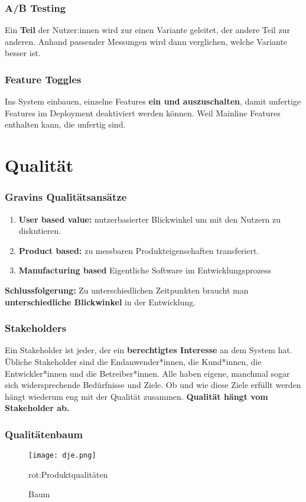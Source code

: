 \documentclass{book}
\begin{document}
    \subsection{A/B Testing}
    Ein \textbf{Teil} der Nutzer:innen wird zur einen Variante geleitet, der andere Teil zur anderen. Anhand passender Messungen wird dann verglichen, welche Variante besser ist.
    \subsection{Feature Toggles}
    Ins System einbauen, einzelne Features \textbf{ein und auszuschalten}, damit unfertige Features im Deployment deaktiviert werden können. Weil Mainline Features enthalten kann, die unfertig sind.


    \chapter{Qualität}
    \subsection{Gravins Qualitätsansätze}
    \begin{enumerate}
        \item \textbf{User based value:}
        nutzerbasierter Blickwinkel um mit den Nutzern zu diskutieren.
        \item \textbf{Product based:} zu messbaren Produkteigenschaften transferiert.
        \item \textbf{Manufacturing based}
        Eigentliche Software im Entwicklungsprozess
    \end{enumerate}
    \textbf{Schlussfolgerung:} Zu unterschiedlichen Zeitpunkten braucht man \textbf{unterschiedliche Blickwinkel} in der Entwicklung.
    \subsection{Stakeholders}
    Ein Stakeholder ist
    jeder, der ein \textbf{berechtigtes Interesse} an dem System hat. Übliche Stakeholder sind die Endanwender*innen, die
    Kund*innen, die Entwickler*innen und die Betreiber*innen. \newline Alle haben eigene, manchmal sogar sich
    widersprechende Bedürfnisse und Ziele. \newline Ob und wie diese Ziele erfüllt werden hängt wiederum eng mit der
    Qualität zusammen.
    \textbf{Qualität hängt vom Stakeholder ab.}
    \subsection{Qualitätenbaum}
    \begin{figure}[H]
        \centering
        \texttt{[image: dje.png]}
        \caption{Baum}
        \label{fig:enter-label}
        rot:Produktqualitäten
    \end{figure}
\end{document}
